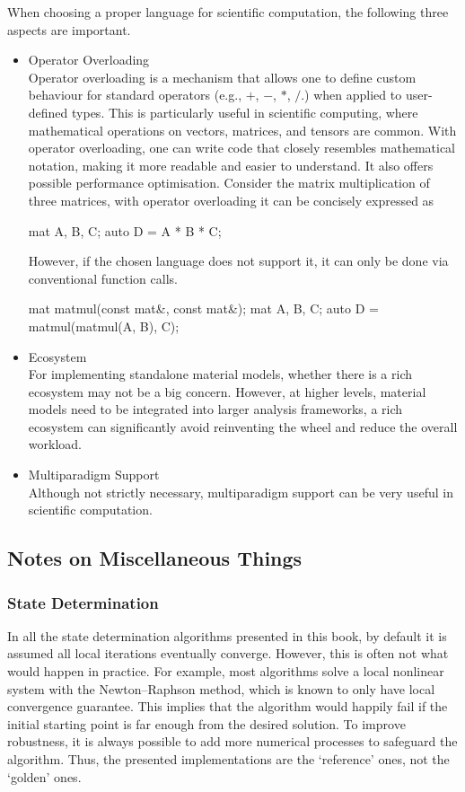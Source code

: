 When choosing a proper language for scientific computation, the following three aspects are important.
\begin{itemize}
    \item Operator Overloading\\Operator overloading is a mechanism that allows one to define custom behaviour for standard operators (e.g., $+$, $-$, $*$, $/$.) when applied to user-defined types.
          This is particularly useful in scientific computing, where mathematical operations on vectors, matrices, and tensors are common.
          With operator overloading, one can write code that closely resembles mathematical notation, making it more readable and easier to understand.
          It also offers possible performance optimisation.
          Consider the matrix multiplication of three matrices, with operator overloading it can be concisely expressed as
          \begin{cppcode}
              mat A, B, C;
              auto D = A * B * C;
          \end{cppcode}
          However, if the chosen language does not support it, it can only be done via conventional function calls.
          \begin{cppcode}
              mat matmul(const mat&, const mat&);
              mat A, B, C;
              auto D = matmul(matmul(A, B), C);
          \end{cppcode}
    \item Ecosystem\\
          For implementing standalone material models, whether there is a rich ecosystem may not be a big concern.
          However, at higher levels, material models need to be integrated into larger analysis frameworks, a rich ecosystem can significantly avoid reinventing the wheel and reduce the overall workload.
    \item Multiparadigm Support\\Although not strictly necessary, multiparadigm support can be very useful in scientific computation.
\end{itemize}
\subsection{Notes on Miscellaneous Things}
\subsubsection{State Determination}
In all the state determination algorithms presented in this book, by default it is assumed all local iterations eventually converge.
However, this is often not what would happen in practice.
For example, most algorithms solve a local nonlinear system with the Newton--Raphson method, which is known to only have local convergence guarantee.
This implies that the algorithm would happily fail if the initial starting point is far enough from the desired solution.
To improve robustness, it is always possible to add more numerical processes to safeguard the algorithm.
Thus, the presented implementations are the `reference' ones, not the `golden' ones.
